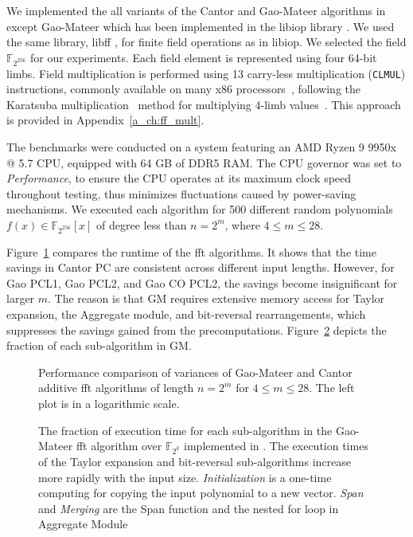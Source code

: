 We implemented the all variants of the Cantor and Gao-Mateer algorithms in \CC except Gao-Mateer which has been implemented in the libiop library \cite{libiop}. We used the same library, libff \cite{libff}, for finite field operations as in libiop. We selected the field $\mathbb{F}_{2^{256}}$ for our experiments. Each field element is represented using four 64-bit limbs. Field multiplication is performed using 13 carry-less multiplication (\texttt{CLMUL}) instructions, commonly available on many x86 processors~\cite{gueron2010intel}, following the Karatsuba multiplication~\cite{karatsuba1962multiplication} method for multiplying 4-limb values~\cite{libiop}. This approach is provided in Appendix~\ref{a_ch:ff_mult}.

The benchmarks were conducted on a system featuring an AMD Ryzen 9 9950x @ 5.7 CPU, equipped with 64 GB of DDR5 RAM. The CPU governor was set to \textit{Performance}, to ensure the CPU operates at its maximum clock speed throughout testing, thus minimizes fluctuations caused by power-saving mechanisms.
We executed each algorithm for 500 different random polynomials \( f(x) \in \mathbb{F}_{2^{256}}[x] \) of degree less than \( n = 2^m \), where \( 4 \leq m \leq 28 \).

Figure~\ref{fig:benchmark} compares the runtime of the \gls{fft} algorithms. It shows that the time savings in Cantor PC are consistent across different input lengths. However, for Gao PCL1, Gao PCL2, and Gao CO PCL2, the savings become insignificant for larger $m$. The reason is that GM requires extensive memory access for Taylor expansion, the \textsf{Aggregate} module, and bit-reversal rearrangements, which suppresses the savings gained from the precomputations.  Figure~\ref{fig:sub_parts_normalized} depicts the fraction of each sub-algorithm in GM.

\begin{figure}
	\centering
	\resizebox{\textwidth}{!}{
		
	}
	\caption[Performance comparison of variances of Gao-Mateer and Cantor FFT algorithms]{Performance comparison of variances of Gao-Mateer and Cantor additive \gls{fft} algorithms of length $n=2^m$ for $4\leq m \leq 28$. The left plot is in a logarithmic scale. }
	\label{fig:benchmark}
\end{figure}

\begin{figure}[ht!]
	\centering
	\resizebox{.9\textwidth}{!}{
		
	}
	\caption[The fraction of execution time for each sub-algorithm in the Gao-Mateer FFT algorithm]{The fraction of execution time for each sub-algorithm in the Gao-Mateer \gls{fft} algorithm over $\mathbb{F}_{2^k}$ implemented in \cite{libiop}. The execution times of the Taylor expansion and bit-reversal sub-algorithms increase more rapidly with the input size.  \textit{Initialization} is a one-time computing for copying the input polynomial to a new vector. \textit{Span} and \textit{Merging} are the \textsf{Span} function and the nested for loop in \textsf{Aggregate} Module}
	\label{fig:sub_parts_normalized}
\end{figure}

